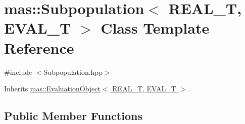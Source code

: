 \hypertarget{classmas_1_1_subpopulation}{}\section{mas\+:\+:Subpopulation$<$ R\+E\+A\+L\+\_\+\+T, E\+V\+A\+L\+\_\+\+T $>$ Class Template Reference}
\label{classmas_1_1_subpopulation}


{\ttfamily \#include $<$Subpopulation.\+hpp$>$}



Inherits \hyperlink{classmas_1_1_evaluation_object}{mas\+::\+Evaluation\+Object$<$ R\+E\+A\+L\+\_\+\+T, E\+V\+A\+L\+\_\+\+T $>$}.

\subsection*{Public Member Functions}
